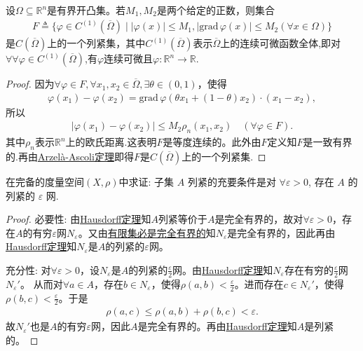\documentclass[../../main.tex]{subfiles}%
\begin{document}
\begin{example}
设$\Omega\subseteq\mathbb{R}^n$是有界开凸集。若$M_1,M_2$是两个给定的正数，则集合
\begin{align*}
F\triangleq\{\varphi\in C^{(1)}(\overline{\Omega})\mid |\varphi(x)|\leqslant M_1,|\mathrm{grad}\,\varphi(x)|\leqslant M_2(\forall x\in\Omega)\}
\end{align*}
是$C(\overline{\Omega})$上的一个列紧集，其中$C^{(1)}(\overline{\Omega})$表示$\overline{\Omega}$上的连续可微函数全体,即对$\forall \forall \varphi\in C^{(1)}(\overline{\Omega})$,有$\varphi$连续可微且$\varphi:\mathbb{R}^n\to \mathbb{R}$.
\end{example}
\begin{proof}
因为$\forall\varphi\in F,\forall x_1,x_2\in\overline{\Omega},\exists\theta\in(0,1)$，使得
\begin{align*}
\varphi(x_1)-\varphi(x_2)=\mathrm{grad}\,\varphi(\theta x_1+(1-\theta)x_2)\cdot(x_1-x_2),
\end{align*}
所以
\begin{align*}
|\varphi(x_1)-\varphi(x_2)|\leqslant M_2\rho_n(x_1,x_2)\quad (\forall\varphi\in F).
\end{align*}
其中$\rho_n$表示$\mathbb{R}^n$上的欧氏距离.这表明$F$是等度连续的。此外由$F$定义知$F$是一致有界的.再由\hyperref[theorem:泛函分析--Arzelà-Ascoli定理]{Arzelà-Ascoli定理}即得$F$是$C(\overline{\Omega})$上的一个列紧集.
\end{proof}

\begin{example}
在完备的度量空间$(X,\rho)$中求证: 子集 $A$ 列紧的充要条件是对 $\forall \varepsilon > 0$, 存在 $A$ 的列紧的 $\varepsilon$ 网.
\end{example}
\begin{proof}

{\heiti 必要性:} 由\hyperref[theorem:泛函分析--Hausdorff定理]{Hausdorff定理}知$A$列紧等价于$A$是完全有界的，故对$\forall \varepsilon >0$，存在$A$的有穷$\varepsilon$网$N_{\varepsilon}$。又由\hyperref[proposition:完全有界必有界-2]{有限集必是完全有界的}知$N_{\varepsilon}$是完全有界的，因此再由\hyperref[theorem:泛函分析--Hausdorff定理]{Hausdorff定理}知$N_{\varepsilon}$是$A$的列紧的$\varepsilon$网。

{\heiti 充分性:} 对$\forall \varepsilon >0$，设$N_{\varepsilon}$是$A$的列紧的$\frac{\varepsilon}{2}$网。由\hyperref[theorem:泛函分析--Hausdorff定理]{Hausdorff定理}知$N_{\varepsilon}$存在有穷的$\frac{\varepsilon}{2}$网$N_{\varepsilon}'$。
从而对$\forall a\in A$，存在$b\in N_{\varepsilon}$，使得$\rho(a,b)<\frac{\varepsilon}{2}$。进而存在$c\in N_{\varepsilon}'$，使得$\rho(b,c)<\frac{\varepsilon}{2}$。于是
\begin{align*}
\rho(a,c)\leqslant\rho(a,b)+\rho(b,c)<\varepsilon.
\end{align*}
故$N_{\varepsilon}'$也是$A$的有穷$\varepsilon$网，因此$A$是完全有界的。再由\hyperref[theorem:泛函分析--Hausdorff定理]{Hausdorff定理}知$A$是列紧的。
\end{proof}
\end{document}

